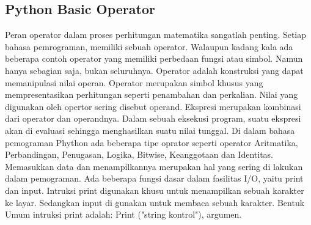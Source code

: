 \subsection{Python Basic Operator}
Peran operator dalam proses perhitungan matematika sangatlah penting.
Setiap bahasa pemrograman, memiliki sebuah operator. Walaupun kadang kala ada beberapa contoh operator yang memiliki perbedaan fungsi atau simbol. Namun hanya sebagian saja, bukan seluruhnya. Operator adalah konstruksi yang dapat memanipulasi nilai operan.
Operator merupakan simbol khusus yang mempresentasikan perhitungan seperti penambahan dan perkalian. Nilai yang digunakan oleh opertor sering disebut operand. Ekspresi merupakan kombinasi dari operator dan operandnya. Dalam sebuah eksekusi program, suatu ekspresi akan di evaluasi sehingga menghasilkan suatu nilai tunggal. Di dalam bahasa pemograman Phython ada beberapa tipe oprator seperti operator Aritmatika, Perbandingan, Penugasan, Logika, Bitwise, Keanggotaan dan Identitas. Memasukkan data dan menampilkannya merupakan hal yang sering di lakukan dalam pemograman. Ada beberapa fungsi dasar dalam fasilitas I/O, yaitu print dan input. Intruksi print digunakan khusu untuk menampilkan sebuah karakter ke layar. Sedangkan input di gunakan untuk membaca sebuah karakter. Bentuk Umum intruksi print adalah: Print ("string kontrol"), argumen.

